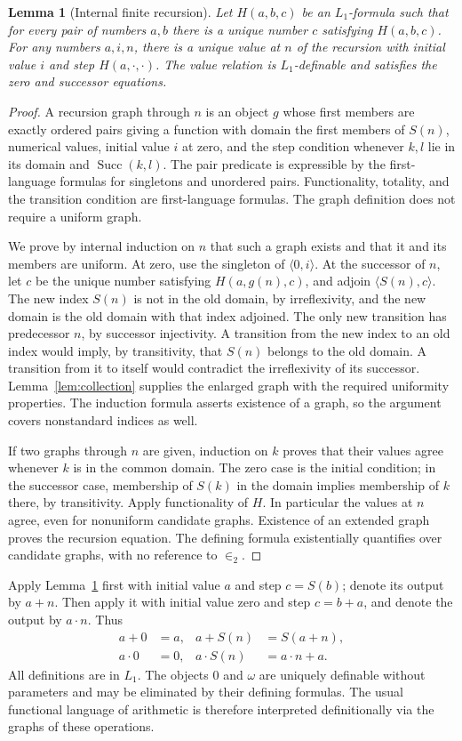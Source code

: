 \documentclass[11pt,a4paper]{article}
\numberwithin{equation}{section}
\newtheorem{lemma}[theorem]{Lemma}
\theoremstyle{definition}
\theoremstyle{remark}
\newcommand{\Succ}{\operatorname{Succ}}
\newcommand{\exttwo}{\in_2}
\begin{document}
\begin{lemma}[Internal finite recursion]\label{lem:recursion}
Let $H(a,b,c)$ be an $L_1$-formula such that for every pair of numbers $a,b$ there is a unique number $c$ satisfying $H(a,b,c)$. For any numbers $a,i,n$, there is a unique value at $n$ of the recursion with initial value $i$ and step $H(a,\cdot,\cdot)$. The value relation is $L_1$-definable and satisfies the zero and successor equations.
\end{lemma}
\begin{proof}
A recursion graph through $n$ is an object $g$ whose first members are exactly ordered pairs giving a function with domain the first members of $S(n)$, numerical values, initial value $i$ at zero, and the step condition whenever $k,l$ lie in its domain and $\Succ(k,l)$. The pair predicate is expressible by the first-language formulas for singletons and unordered pairs. Functionality, totality, and the transition condition are first-language formulas. The graph definition does not require a uniform graph.

We prove by internal induction on $n$ that such a graph exists and that it and its members are uniform. At zero, use the singleton of $\langle 0,i\rangle$. At the successor of $n$, let $c$ be the unique number satisfying $H(a,g(n),c)$, and adjoin $\langle S(n),c\rangle$. The new index $S(n)$ is not in the old domain, by irreflexivity, and the new domain is the old domain with that index adjoined. The only new transition has predecessor $n$, by successor injectivity. A transition from the new index to an old index would imply, by transitivity, that $S(n)$ belongs to the old domain. A transition from it to itself would contradict the irreflexivity of its successor. Lemma~\ref{lem:collection} supplies the enlarged graph with the required uniformity properties. The induction formula asserts existence of a graph, so the argument covers nonstandard indices as well.

If two graphs through $n$ are given, induction on $k$ proves that their values agree whenever $k$ is in the common domain. The zero case is the initial condition; in the successor case, membership of $S(k)$ in the domain implies membership of $k$ there, by transitivity. Apply functionality of $H$. In particular the values at $n$ agree, even for nonuniform candidate graphs. Existence of an extended graph proves the recursion equation. The defining formula existentially quantifies over candidate graphs, with no reference to $\exttwo$.
\end{proof}
Apply Lemma~\ref{lem:recursion} first with initial value $a$ and step $c=S(b)$; denote its output by $a+n$. Then apply it with initial value zero and step $c=b+a$, and denote the output by $a\cdot n$. Thus
\begin{align*}
a+0&=a,& a+S(n)&=S(a+n),\\
a\cdot 0&=0,& a\cdot S(n)&=a\cdot n+a.
\end{align*}
All definitions are in $L_1$. The objects $0$ and $\omega$ are uniquely definable without parameters and may be eliminated by their defining formulas. The usual functional language of arithmetic is therefore interpreted definitionally via the graphs of these operations.
\end{document}
